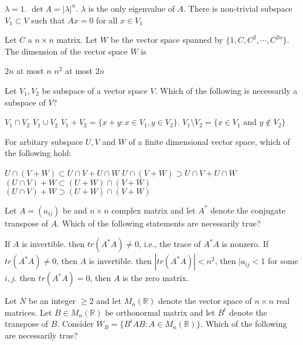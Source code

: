 \documentclass[10pt]{exam}
\newcommand{\R}{\ensuremath{\mathbb{R}}}
\begin{document}
\begin{questions}
\begin{checkboxes}
\choice $\lambda =1$.
\choice $\det A=|\lambda|^n$.
\choice $\lambda$ is the only eigenvalue of $A$.
\choice There is non-trivial subspace $V_1 \subset V$ such that $Ax=0$ for all $x \in V_1$
\end{checkboxes}

\question
Let $C$ a $n\times n$  matrix. Let $W$ be the vector space spanned by $\{1,C,C^2,\cdots, C^{2n}\}$. The dimension of the vector space $W$ is

\begin{oneparcheckboxes}
\choice $2n$
\choice at most $n$
\choice $n^2$
\choice at most $2n$
\end{oneparcheckboxes}

\question
Let $V_1,V_2$ be subspace of a vector space $V$. Which of the following is necessarily a subspace of $V$?

\begin{checkboxes}
\choice $V_1 \cap V_2$
\choice $V_1 \cup V_2$
\choice $V_1+V_2=\{x+y:x \in V_1, y\in V_2 \}$.
\choice $V_1\setminus V_2=\{x\in V_1 \text{ and } y  \notin V_2\}$
\end{checkboxes}

\question
For arbitary subspace $U, V$ and $W$ of a finite dimensional vector space, which of the following hold:

\begin{checkboxes}
\choice $U \cap (V + W) \subset U \cap V + U \cap W $
\choice $U \cap (V + W) \supset U \cap V + U \cap W $
\choice $(U \cap V) + W \subset (U +W) \cap (V + W) $
\choice $(U \cap V) + W \supset (U +W) \cap (V + W) $
\end{checkboxes}


\question
Let $A=(a_{ij})$ be and $n\times n$ complex matrix and let $A^*$ denote the conjugate transpose of $A$. Which of the following statements are necessarily true?

\begin{checkboxes}
\choice If $A$ is invertible. then $tr(A^*A)\neq 0$, i.e., the trace of $A^*A$ is nonzero.
\choice If $tr(A^*A)\neq 0$, then $A$ is invertible. 
\choice then $|tr(A^*A)|<n^2$, then $|a_{ij}<1$ for some $i,j$.
\choice then $tr(A^*A)=0$, then $A$ is the zero matrix.
\end{checkboxes}

\question
Let $N$ be an integer $\geq 2$ and let $M_n(\R)$ denote the vector space of $n\times n$ real matrices. Let $B \in M_n(\R)$ be orthonormal matrix and let $B^t$ denote the transpose of $B$. Consider $W_B=\{B^tAB:A \in M_n(\R)\}$. Which of the following are necessarily true?


\end{questions}
\end{document}
